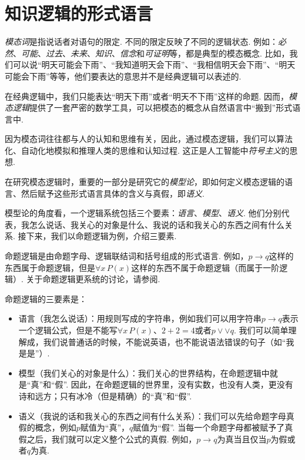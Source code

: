 \section{知识逻辑的形式语言}

\textit{模态词}是指说话者对语句的限定. 不同的限定反映了不同的逻辑状态. 例如：\textit{必然}、\textit{可能}、\textit{过去}、\textit{未来}、\textit{知识}、\textit{信念}和\textit{可证明}等，都是典型的模态概念. 比如，我们可以说“明天可能会下雨”、“我知道明天会下雨”、“我相信明天会下雨”、“明天可能会下雨”等等，他们要表达的意思并不是经典逻辑可以表述的. 

在经典逻辑中，我们只能表达“明天下雨”或者“明天不下雨”这样的命题. 因而，\textit{模态逻辑}提供了一套严密的数学工具，可以把模态的概念从自然语言中“搬到”形式语言中. 

因为模态词往往都与人的认知和思维有关，因此，通过模态逻辑，我们可以算法化、自动化地模拟和推理人类的思维和认知过程. 这正是人工智能中\textit{符号主义}的思想. 

在研究模态逻辑时，重要的一部分是研究它的\textit{模型论}，即如何定义模态逻辑的语言、然后赋予这些形式语言具体的含义与真假，即\textit{语义}. 

模型论的角度看，一个逻辑系统包括三个要素：\textit{语言}、\textit{模型}、\textit{语义}. 他们分别代表，我怎么说话、我关心的对象是什么、我说的话和我关心的东西之间有什么关系. 接下来，我们以命题逻辑为例，介绍三要素. 

\begin{example}[命题逻辑的逻辑三要素]
命题逻辑是由命题字母、逻辑联结词和括号组成的形式语言. 例如，$p\to q$这样的东西属于命题逻辑，但是$\forall x\, P(x)$这样的东西不属于命题逻辑（而属于一阶逻辑）. 关于命题逻辑更系统的讨论，请参阅. 

命题逻辑的三要素是：

\begin{itemize}
    \item 语言（我怎么说话）：用规则写成的字符串，例如我们可以用字符串$p\to q$表示一个逻辑公式，但是不能写$\forall x\, P(x)$、$2+2=4$或者$p\vee\vee q$. 我们可以简单理解成，我们说普通话的时候，不能说英语，也不能说语法错误的句子（如“我是是”）. 
    \item 模型（我们关心的对象是什么）：我们关心的世界结构，在命题逻辑中就是“真”和“假”. 因此，在命题逻辑的世界里，没有实数，也没有人类，更没有诗和远方；只有冰冷（但是精确）的“真”和“假”. 
    \item 语义（我说的话和我关心的东西之间有什么关系）：我们可以先给命题字母真假的概念，例如$p$赋值为“真”，$q$赋值为“假”. 当每一个命题字母都被赋予了真假之后，我们就可以定义整个公式的真假. 例如，$p\to q$为真当且仅当$p$为假或者$q$为真. 
\end{itemize}
\end{example}

